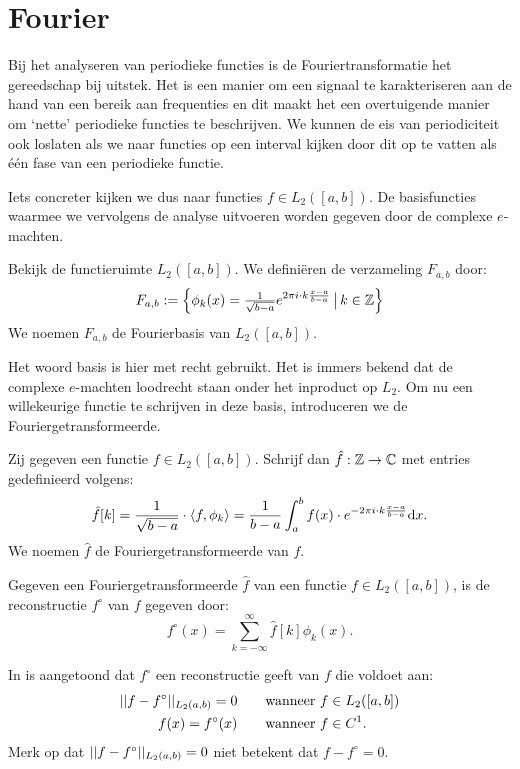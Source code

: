 \chapter{Fourier}
\label{fourierH}

Bij het analyseren van periodieke functies is de Fouriertransformatie het gereedschap bij uitstek.
Het is een manier om een signaal te karakteriseren aan de hand van een bereik aan frequenties en dit maakt het een overtuigende manier om `nette' periodieke functies te beschrijven.
We kunnen de eis van periodiciteit ook loslaten als we naar functies op een interval kijken door dit op te vatten
als \'e\'en fase van een periodieke functie.

Iets concreter kijken we dus naar functies $f \in L_2([a,b])$. De basisfuncties waarmee we vervolgens de analyse uitvoeren worden gegeven door de complexe $e$-machten.
\begin{definitie}[Fourierbasis] Bekijk de functieruimte $L_2([a,b])$. We defini\"eren de verzameling $F_{a,b}$ 
door:
\[
  F_{a,b} := \left\{ \phi_k(x) = \tfrac{1}{\sqrt{b-a}} e^{{2\pi i} \cdot k \frac{x-a}{b-a}} \,\big|\, k \in \mathbb{Z} \right\}
\]
We noemen $F_{a,b}$ de Fourierbasis van $L_2([a,b])$.
\end{definitie}
Het woord basis is hier met recht gebruikt. Het is immers bekend dat de complexe $e$-machten loodrecht staan onder
het inproduct op $L_2$. 
Om nu een willekeurige functie te schrijven in deze basis, introduceren
we de Fouriergetransformeerde.
\begin{definitie}[Fouriertransformatie]
Zij gegeven een functie $f\in L_2([a,b])$. Schrijf dan $\hat f : \mathbb{Z}\to\mathbb{C}$ met entries gedefinieerd volgens:
\[
  \hat f [k] = \frac{1}{\sqrt{b-a}} \cdot \langle f , \phi_k \rangle = \frac{1}{b-a} \int_a^b f(x) \cdot e^{-2 \pi i \cdot k \frac{x-a}{b-a}}{\mathrm{d} x}.
\]
We noemen $\hat f$ de Fouriergetransformeerde van $f$.
\end{definitie}
\begin{definitie}
  Gegeven een Fouriergetransformeerde $\hat f$ van een functie $f \in L_2([a,b])$, is de reconstructie $f^\circ$ van $f$ gegeven door:
  \[
    f^\circ (x) = \sum_{k=-\infty}^\infty \hat f [k] \phi_k(x).
  \]
\end{definitie}

In \cite{fourier-rec} is aangetoond dat $f^\circ$ een reconstructie geeft van $f$ die voldoet aan: 
\begin{eqnarray}
  {||f-f^\circ||_{L_2(a,b)}}=0 \quad\quad \text{wanneer }& f\in L_2([a,b]) \\
  f(x) = f^\circ(x) \quad\quad \text{wanneer }& f \in C^1.
\end{eqnarray}
Merk op dat ${||f-f^\circ||_{L_2(a,b)}}=0$ niet betekent dat $f - f^\circ = 0$.

